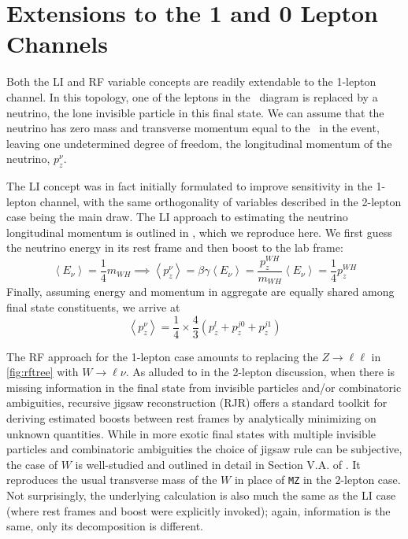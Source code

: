 \section{Extensions to the 1 and 0 Lepton Channels}
Both the LI and RF variable concepts are readily extendable to the 1-lepton channel.  In this topology, one of the leptons in the \ZH\, diagram is replaced by a neutrino, the lone invisible particle in this final state.  We can assume that the neutrino has zero mass and transverse momentum equal to the \met\, in the event, leaving one undetermined degree of freedom, the longitudinal momentum of the neutrino, $p_z^{\nu}$.  

The LI concept was in fact initially formulated to improve sensitivity in the 1-lepton channel, with the same orthogonality of variables described in the 2-lepton case being the main draw.  The LI approach to estimating the neutrino longitudinal momentum is outlined in \cite{litalk}, which we reproduce here.  We first guess the neutrino energy in its rest frame and then boost to the lab frame:
\begin{equation}
\left<E_\nu\right>=\frac{1}{4}m_{WH}\implies \left<p_z^{\nu}\right>=\beta\gamma\left<E_\nu\right>=\frac{p_z^{WH}}{m_{WH}}\left<E_\nu\right>=\frac{1}{4}p_z^{WH}
\end{equation}
Finally, assuming energy and momentum in aggregate are equally shared among final state constituents, we arrive at
\begin{equation}
\label{eqn:lipz}
\left<p_z^{\nu}\right>=\frac{1}{4}\times \frac{4}{3}\left(p_z^l+p_z^{j0}+p_z^{j1}\right)
\end{equation}

The RF approach for the 1-lepton case amounts to replacing the $Z\to\ell\ell$ in \ref{fig:rftree} with $W\to\ell\nu$.  As alluded to in the 2-lepton discussion, when there is missing information in the final state from invisible particles and/or combinatoric ambiguities, recursive jigsaw reconstruction (RJR) offers a standard toolkit for deriving estimated boosts between rest frames by analytically minimizing on unknown quantities.  While in more exotic final states with multiple invisible particles and combinatoric ambiguities the choice of jigsaw rule can be subjective, the case of $W$ is well-studied and outlined in detail in Section V.A. of \cite{rjr}.  It reproduces the usual transverse mass of the $W$ in place of \texttt{MZ} in the 2-lepton case.  Not surprisingly, the underlying calculation is also much the same as the LI case (where rest frames and boost were explicitly invoked); again, information is the same, only its decomposition is different.

